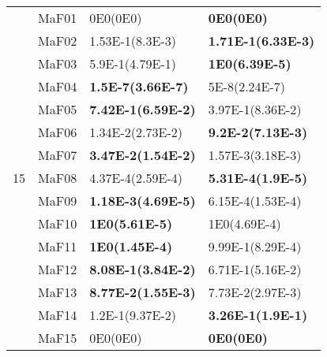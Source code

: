 \documentclass[]{article}
\begin{document}
\begin{table}
\begin{footnotesize}
\begin{tabular}{|l|l|l|l|}
\multirow{15}{*}{15} & MaF01 & \cellcolor{gray95} 0E0(0E0) & \cellcolor{gray95} {\bf 0E0(0E0)}\\
 & MaF02 & 1.53E-1(8.3E-3) & \cellcolor{gray95} {\bf 1.71E-1(6.33E-3)}\\
 & MaF03 & 5.9E-1(4.79E-1) & \cellcolor{gray95} {\bf 1E0(6.39E-5)}\\
 & MaF04 & \cellcolor{gray95} {\bf 1.5E-7(3.66E-7)} & \cellcolor{gray95} 5E-8(2.24E-7)\\
 & MaF05 & \cellcolor{gray95} {\bf 7.42E-1(6.59E-2)} & 3.97E-1(8.36E-2)\\
 & MaF06 & 1.34E-2(2.73E-2) & \cellcolor{gray95} {\bf 9.2E-2(7.13E-3)}\\
 & MaF07 & \cellcolor{gray95} {\bf 3.47E-2(1.54E-2)} & 1.57E-3(3.18E-3)\\
 & MaF08 & 4.37E-4(2.59E-4) & \cellcolor{gray95} {\bf 5.31E-4(1.9E-5)}\\
 & MaF09 & \cellcolor{gray95} {\bf 1.18E-3(4.69E-5)} & 6.15E-4(1.53E-4)\\
 & MaF10 & \cellcolor{gray95} {\bf 1E0(5.61E-5)} & \cellcolor{gray95} 1E0(4.69E-4)\\
 & MaF11 & \cellcolor{gray95} {\bf 1E0(1.45E-4)} & \cellcolor{gray95} 9.99E-1(8.29E-4)\\
 & MaF12 & \cellcolor{gray95} {\bf 8.08E-1(3.84E-2)} & 6.71E-1(5.16E-2)\\
 & MaF13 & \cellcolor{gray95} {\bf 8.77E-2(1.55E-3)} & 7.73E-2(2.97E-3)\\
 & MaF14 & 1.2E-1(9.37E-2) & \cellcolor{gray95} {\bf 3.26E-1(1.9E-1)}\\
 & MaF15 & \cellcolor{gray95} 0E0(0E0) & \cellcolor{gray95} {\bf 0E0(0E0)}\\
\hline
\end{tabular}
\end{footnotesize}
\end{table}
\end{document}
